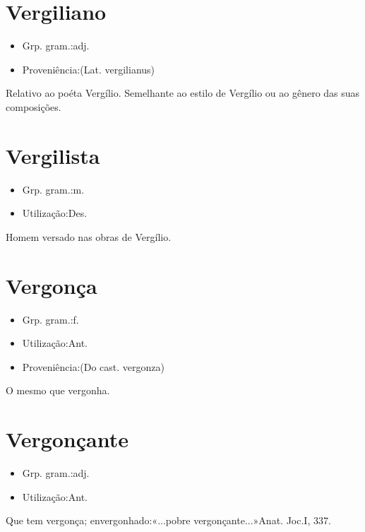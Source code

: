 \documentclass{article}
\begin{document}
\section{Vergiliano}
\begin{itemize}
\item {Grp. gram.:adj.}
\end{itemize}
\begin{itemize}
\item {Proveniência:(Lat. \textunderscore vergilianus\textunderscore )}
\end{itemize}
Relativo ao poéta Vergílio.
Semelhante ao estilo de Vergílio ou ao gênero das suas composições.
\section{Vergilista}
\begin{itemize}
\item {Grp. gram.:m.}
\end{itemize}
\begin{itemize}
\item {Utilização:Des.}
\end{itemize}
Homem versado nas obras de Vergílio.
\section{Vergonça}
\begin{itemize}
\item {Grp. gram.:f.}
\end{itemize}
\begin{itemize}
\item {Utilização:Ant.}
\end{itemize}
\begin{itemize}
\item {Proveniência:(Do cast. \textunderscore vergonza\textunderscore )}
\end{itemize}
O mesmo que \textunderscore vergonha\textunderscore .
\section{Vergonçante}
\begin{itemize}
\item {Grp. gram.:adj.}
\end{itemize}
\begin{itemize}
\item {Utilização:Ant.}
\end{itemize}
Que tem vergonça; envergonhado:«\textunderscore ...pobre vergonçante...\textunderscore »\textunderscore Anat. Joc.\textunderscore  I, 337.
\end{document}

